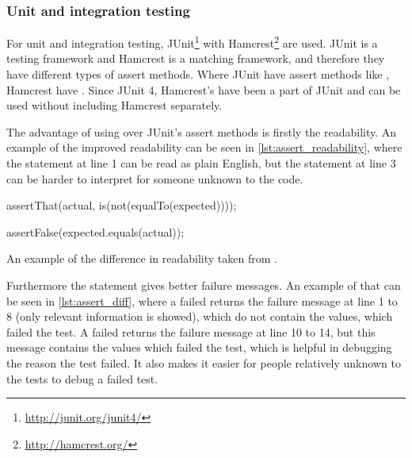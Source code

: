 \subsubsection{Unit and integration testing}
For unit and integration testing, JUnit\footnote{\url{http://junit.org/junit4/}} with Hamcrest\footnote{\url{http://hamcrest.org/}} are used.
JUnit is a testing framework and Hamcrest is a matching framework, and therefore they have different types of assert methods.
Where JUnit have assert methods like , Hamcrest have .
Since JUnit 4, Hamcrest's  have been a part of JUnit and can be used without including Hamcrest separately\cite{hamcrest_vs_junit}.

The advantage of using  over JUnit's assert methods is firstly the readability.
An example of the improved readability can be seen in \cref{lst:assert_readability}, 
where the  statement at line 1 can be read as plain English, 
but the  statement at line 3 can be harder to interpret for someone unknown to the code\cite{hamcrest_vs_junit}.

\begin{listing}
    \begin{java2}
        assertThat(actual, is(not(equalTo(expected))));

        assertFalse(expected.equals(actual));
    \end{java2}
    \caption{An example of the difference in readability taken from \cite{hamcrest_vs_junit}.}
    \label{lst:assert_readability}
\end{listing}

Furthermore the  statement gives better failure messages\cite{hamcrest_vs_junit}.
An example of that can be seen in \cref{lst:assert_diff},
where a failed  returns the failure message at line 1 to 8 (only relevant information is showed),
which do not contain the values, which failed the test.
A failed  returns the failure message at line 10 to 14, 
but this message contains the values which failed the test,
which is helpful in debugging the reason the test failed.
It also makes it easier for people relatively unknown to the tests to debug a failed test.

